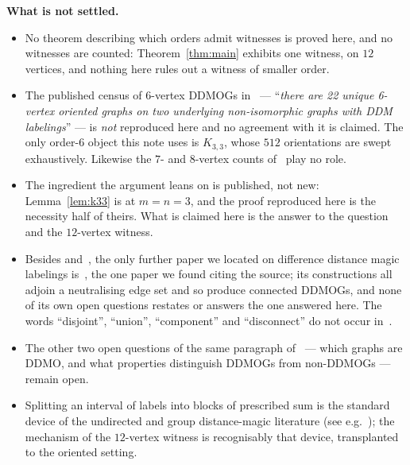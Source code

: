 \documentclass[11pt]{amsart}
\begin{document}
\medskip\noindent\textbf{What is not settled.}
\begin{itemize}
\item No theorem describing which orders admit witnesses is proved here, and no witnesses are
counted: Theorem~\ref{thm:main} exhibits one witness, on $12$ vertices, and nothing here rules
out a witness of smaller order.
\item The published census of $6$-vertex DDMOGs in~\cite{Altman} --- ``\emph{there are 22
unique 6-vertex oriented graphs on two underlying non-isomorphic graphs with DDM labelings}''
--- is \emph{not} reproduced here and no agreement with it is claimed. The only order-$6$
object this note uses is $K_{3,3}$, whose $512$ orientations are swept exhaustively. Likewise
the $7$- and $8$-vertex counts of~\cite{Altman} play no role.
\item The ingredient the argument leans on is published, not new: Lemma~\ref{lem:k33} is
\cite[Theorem~5]{Altman} at $m=n=3$, and the proof reproduced here is the necessity half of
theirs. What is claimed here is the answer to the question and the $12$-vertex witness.
\item Besides \cite{Source} and~\cite{Altman}, the only further paper we located on difference
distance magic labelings is~\cite{Ornaments}, the one paper we found citing the source; its
constructions all adjoin a neutralising edge set and so produce connected DDMOGs, and none of
its own open questions restates or answers the one answered here. The words ``disjoint'',
``union'', ``component'' and ``disconnect'' do not occur in~\cite{Altman}.
\item The other two open questions of the same paragraph of~\cite{Source} --- which graphs are
DDMO, and what properties distinguish DDMOGs from non-DDMOGs --- remain open.
\item Splitting an interval of labels into blocks of prescribed sum is the standard device of
the undirected and group distance-magic literature (see e.g.~\cite{CSP}); the mechanism of the
$12$-vertex witness is recognisably that device, transplanted to the oriented setting.
\end{itemize}
\end{document}
